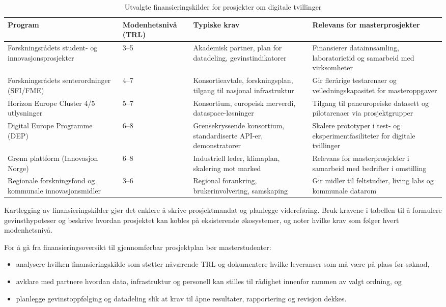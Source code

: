 \begin{table}[h]
    \centering
    \caption{Utvalgte finansieringskilder for prosjekter om digitale tvillinger}
    \label{tab:finansiering}
    \begin{tabular}{p{3.0cm}p{2.4cm}p{4.3cm}p{3.5cm}}
        \toprule
        Program & Modenhetsnivå (TRL) & Typiske krav & Relevans for masterprosjekter \\
        \midrule
        Forskningsrådets student- og innovasjonsprosjekter & 3--5 & Akademisk partner, plan for datadeling, gevinstindikatorer & Finansierer datainnsamling, laboratorietid og samarbeid med virksomheter \\
        Forskningsrådets senterordninger (SFI/FME) & 4--7 & Konsortieavtale, forskningsplan, tilgang til nasjonal infrastruktur & Gir flerårige testarenaer og veiledningskapasitet for masteroppgaver \\
        Horizon Europe Cluster 4/5 utlysninger & 5--7 & Konsortium, europeisk merverdi, dataspace-løsninger & Tilgang til paneuropeiske datasett og pilotarenaer via prosjektgrupper \\
        Digital Europe Programme (DEP) & 6--8 & Grensekryssende konsortium, standardiserte API-er, demonstratorer & Skalere prototyper i test- og eksperimentfasiliteter for digitale tvillinger \\
        Grønn plattform (Innovasjon Norge) & 6--8 & Industriell leder, klimaplan, skalering mot marked & Relevans for masterprosjekter i samarbeid med bedrifter i omstilling \\
        Regionale forskningsfond og kommunale innovasjonsmidler & 3--6 & Regional forankring, brukerinvolvering, samskaping & Gir midler til feltstudier, living labs og kommunale datarom \\
        \bottomrule
    \end{tabular}
\end{table}

Kartlegging av finansieringskilder gjør det enklere å skrive prosjektmandat og planlegge videreføring. Bruk kravene i tabellen til å formulere gevinsthypoteser og beskrive hvordan prosjektet kan kobles på eksisterende økosystemer, og noter hvilke krav som følger hvert modenhetsnivå.\citep{rcn2024programkatalog,eu2024digitaltwinroadmap,innovasjon2024gronnplattform}

For å gå fra finansieringsoversikt til gjennomførbar prosjektplan bør masterstudenter:
\begin{itemize}
    \item analysere hvilken finansieringskilde som støtter nåværende TRL og dokumentere hvilke leveranser som må være på plass før søknad,
    \item avklare med partnere hvordan data, infrastruktur og personell kan stilles til rådighet innenfor rammen av valgt ordning, og
    \item planlegge gevinstoppfølging og datadeling slik at krav til åpne resultater, rapportering og revisjon dekkes.
\end{itemize}

